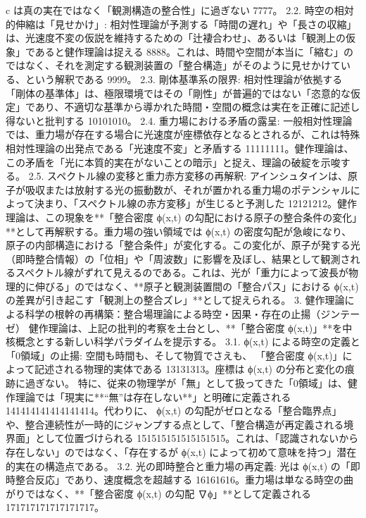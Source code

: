 \documentclass{article}
\begin{document}
c は真の実在ではなく「観測構造の整合性」に過ぎない 7777。
2.2. 時空の相対的伸縮は「見せかけ」:
相対性理論が予測する「時間の遅れ」や「長さの収縮」は、光速度不変の仮説を維持するための「辻褄合わせ」、あるいは「観測上の仮象」であると健作理論は捉える 8888。これは、時間や空間が本当に「縮む」のではなく、それを測定する観測装置の「整合構造」がそのように見せかけている、という解釈である 9999。
2.3. 剛体基準系の限界:
相対性理論が依拠する「剛体の基準体」は、極限環境ではその「剛性」が普遍的ではない「恣意的な仮定」であり、不適切な基準から導かれた時間・空間の概念は実在を正確に記述し得ないと批判する 10101010。
2.4. 重力場における矛盾の露呈:
一般相対性理論では、重力場が存在する場合に光速度が座標依存となるとされるが、これは特殊相対性理論の出発点である「光速度不変」と矛盾する 11111111。健作理論は、この矛盾を「光に本質的実在がないことの暗示」と捉え、理論の破綻を示唆する。
2.5. スペクトル線の変移と重力赤方変移の再解釈:
アインシュタインは、原子が吸収または放射する光の振動数が、それが置かれる重力場のポテンシャルによって決まり、「スペクトル線の赤方変移」が生じると予測した 12121212。健作理論は、この現象を**「整合密度 
ϕ(x,t) の勾配における原子の整合条件の変化」**として再解釈する。重力場の強い領域では ϕ(x,t) の密度勾配が急峻になり、原子の内部構造における「整合条件」が変化する。この変化が、原子が発する光（即時整合情報）の「位相」や「周波数」に影響を及ぼし、結果として観測されるスペクトル線がずれて見えるのである。これは、光が「重力によって波長が物理的に伸びる」のではなく、**原子と観測装置間の「整合パス」における ϕ(x,t) の差異が引き起こす「観測上の整合ズレ」**として捉えられる。
3. 健作理論による科学の根幹の再構築：整合場理論による時空・因果・存在の止揚（ジンテーゼ）
健作理論は、上記の批判的考察を土台とし、**「整合密度 ϕ(x,t)」**を中核概念とする新しい科学パラダイムを提示する。
3.1. ϕ(x,t) による時空の定義と「0領域」の止揚:
空間も時間も、そして物質でさえも、
「整合密度 ϕ(x,t)」によって記述される物理的実体である 13131313。座標は 
ϕ(x,t) の分布と変化の痕跡に過ぎない。
特に、従来の物理学が「無」として扱ってきた「0領域」は、健作理論では「現実に**“無”は存在しない**」と明確に定義される 141414141414141414。代わりに、
ϕ(x,t) の勾配がゼロとなる「整合臨界点」や、整合連続性が一時的にジャンプする点として、「整合構造が再定義される境界面」として位置づけられる 151515151515151515。これは、「認識されないから存在しない」のではなく、「存在するが 
ϕ(x,t) によって初めて意味を持つ」潜在的実在の構造点である。
3.2. 光の即時整合と重力場の再定義:
光は 
ϕ(x,t) の「即時整合反応」であり、速度概念を超越する 16161616。重力場は単なる時空の曲がりではなく、**「整合密度 
ϕ(x,t) の勾配 ∇ϕ」**として定義される 171717171717171717。
\end{document}
